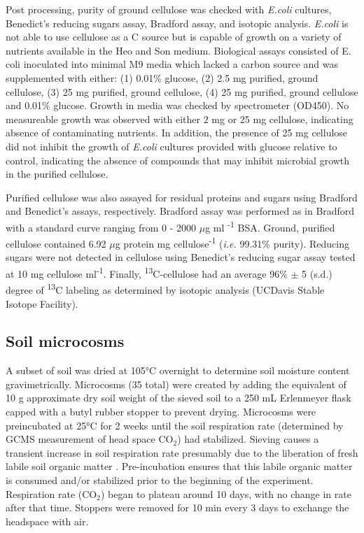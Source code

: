 Post processing, purity of ground cellulose was checked with \textit{E.coli}
cultures, Benedict's reducing sugars assay, Bradford assay, and isotopic
analysis. \textit{E.coli} is not able to use cellulose as a C source but is
capable of growth on a variety of nutrients available in the Heo and Son
medium.  Biological assays consisted of E. coli inoculated into minimal M9
media which lacked a carbon source and was supplemented with either: (1) 0.01\%
glucose, (2) 2.5 mg purified, ground cellulose, (3) 25 mg purified, ground
cellulose, (4) 25 mg purified, ground cellulose and 0.01\% glucose. Growth in
media was checked by spectrometer (OD450). No measureable growth was observed
with either 2 mg or 25 mg cellulose, indicating absence of contaminating
nutrients. In addition, the presence of 25 mg cellulose did not inhibit the
growth of \textit{E.coli} cultures provided with glucose relative to control,
indicating the absence of compounds that may inhibit microbial growth in the
purified cellulose. 

Purified cellulose was also assayed for residual proteins and sugars using
Bradford and Benedict's assays, respectively. Bradford assay was performed as
in Bradford \cite{Bradford_1976} with a standard curve ranging from 0 - 2000
$\mu$g ml \textsuperscript{-1} BSA. Ground, purified cellulose contained 6.92
$\mu$g protein mg cellulose\textsuperscript{-1} (\textit{i.e.} 99.31\% purity).
Reducing sugars were not detected in cellulose using Benedict's reducing sugar
assay \cite{benedict1909reagent} tested at 10 mg cellulose
ml\textsuperscript{-1}. Finally, \textsuperscript{13}C-cellulose had an average
96\% $\pm$ 5 (s.d.) degree of \textsuperscript{13}C labeling as determined by
isotopic analysis (UCDavis Stable Isotope Facility).           

\subsection{Soil microcosms}
A subset of soil was dried at 105°C overnight to determine soil moisture
content gravimetrically. Microcosms (35 total) were created by adding the
equivalent of 10 g approximate dry soil weight of the sieved soil to a 250 mL
Erlenmeyer flask capped with a butyl rubber stopper to prevent drying.
Microcosms were preincubated at 25°C for 2 weeks until the soil respiration
rate (determined by GCMS measurement of head space CO$_{2}$) had stabilized.
Sieving causes a transient increase in soil respiration rate presumably due to
the liberation of fresh labile soil organic matter \cite{Datta_2014}.
Pre-incubation ensures that this labile organic matter is consumed and/or
stabilized prior to the beginning of the experiment. Respiration rate
(CO$_{2}$) began to plateau around 10 days, with no change in rate after that
time. Stoppers were removed for 10 min every 3 days to exchange the headspace
with air. 

